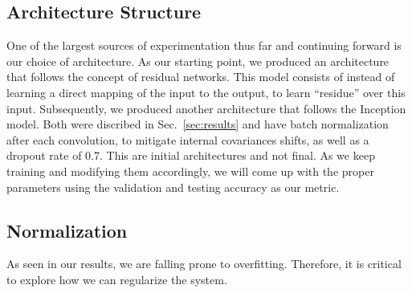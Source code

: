 \documentclass[letterpaper, 10 pt, conference]{../ieeeconf}
\newcommand{\sref}[1]{Sec.~\ref{#1}} %
\begin{document}
\subsection{Architecture Structure}
One of the largest sources of experimentation thus far and continuing forward is our choice of architecture. 
As our starting point, we produced an architecture that follows the concept of residual networks. 
This model consists of instead of learning a direct mapping of the input to the output, to learn ``residue'' over this input. Subsequently, we produced another architecture that follows the Inception model.
Both were discribed in \sref{sec:results} and have batch normalization after each convolution, to mitigate internal covariances shifts, as well as a dropout rate of 0.7. 
This are initial architectures and not final. 
As we keep training and modifying them accordingly, we will come up with the proper parameters using the validation and testing accuracy as our metric.

\subsection{Normalization}
As seen in our results, we are falling prone to overfitting. 
Therefore, it is critical to explore how we can regularize the system. 

{\footnotesize
    
}
\end{document}
